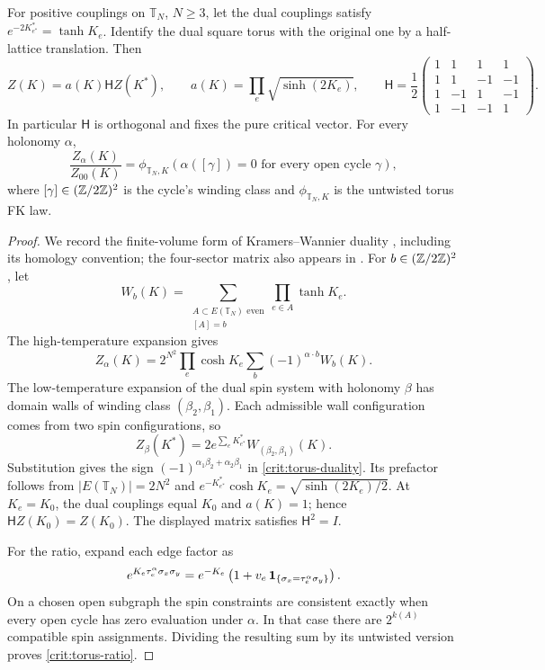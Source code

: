 \begin{lemma}
\label{crit:torus-identities}
For positive couplings on $\mathbb T_N$, $N\ge3$, let the dual couplings satisfy
$e^{-2K_{e^*}^*}=\tanh K_e$. Identify the dual square torus with the
original one by a half-lattice translation. Then
\begin{equation}
 Z(K)=a(K)\mathsf H Z(K^*),\qquad
 a(K)=\prod_e\sqrt{\sinh(2K_e)},\qquad
 \mathsf H=\frac12
 \begin{pmatrix}
 1&1&1&1\\
 1&1&-1&-1\\
 1&-1&1&-1\\
 1&-1&-1&1
 \end{pmatrix}.
 \label{crit:torus-duality}
\end{equation}
In particular $\mathsf H$ is orthogonal and fixes the pure critical
vector. For every holonomy $\alpha$,
\begin{equation}
 \frac{Z_\alpha(K)}{Z_{00}(K)}
 =\phi_{\mathbb T_N,K}
 \left(\alpha([\gamma])=0
       \text{ for every open cycle }\gamma\right),
 \label{crit:torus-ratio}
\end{equation}
where $[\gamma]\in(\mathbb Z/2\mathbb Z)^2$ is the cycle's winding class and
$\phi_{\mathbb T_N,K}$ is the untwisted torus FK law.
\end{lemma}

\begin{proof}
We record the finite-volume form of Kramers--Wannier duality
\cite{KW}, including its homology convention; the four-sector matrix
also appears in \cite[Equations~(4)--(5)]{BS}. For
$b\in(\mathbb Z/2\mathbb Z)^2$, let
\[
 W_b(K)=\sum_{\substack{A\subset E(\mathbb T_N)\text{ even}\\{}[A]=b}}
                    \prod_{e\in A}\tanh K_e.
\]
The high-temperature expansion gives
\[
 Z_\alpha(K)=2^{N^2}\prod_e\cosh K_e
                  \sum_b(-1)^{\alpha\cdot b}W_b(K).
\]
The low-temperature expansion of the dual spin system with holonomy
$\beta$ has domain walls of winding class
$(\beta_2,\beta_1)$. Each admissible wall configuration comes from two
spin configurations, so
\[
 Z_\beta(K^*)=2e^{\sum_eK_{e^*}^*}
                   W_{(\beta_2,\beta_1)}(K).
\]
Substitution gives the sign
$(-1)^{\alpha_1\beta_2+\alpha_2\beta_1}$ in
\eqref{crit:torus-duality}. Its prefactor follows from
$|E(\mathbb T_N)|=2N^2$ and
$e^{-K_{e^*}^*}\cosh K_e=\sqrt{\sinh(2K_e)/2}$.
At $K_e=K_0$, the dual couplings equal $K_0$ and $a(K)=1$; hence
$\mathsf HZ(K_0)=Z(K_0)$. The displayed matrix satisfies
$\mathsf H^2=I$.

For the ratio, expand each edge factor as
\[
 e^{K_e\tau_e^\alpha\sigma_x\sigma_y}
 =e^{-K_e}\left(1+v_e\,
           \mathbf 1_{\{\sigma_x=\tau_e^\alpha\sigma_y\}}\right).
\]
On a chosen open subgraph the spin constraints are consistent exactly
when every open cycle has zero evaluation under $\alpha$. In that case
there are $2^{k(A)}$ compatible spin assignments. Dividing the resulting
sum by its untwisted version proves \eqref{crit:torus-ratio}.
\end{proof}

